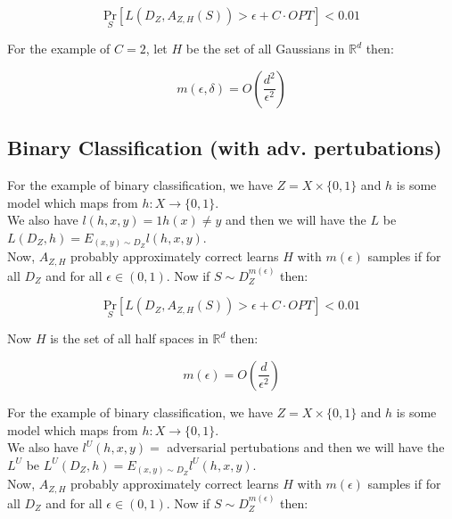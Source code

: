 \documentclass{article}
\begin{document}
\begin{equation}
    \underset{S}{\mathrm{Pr}} [L(D_Z, A_{Z,H}(S)) > \epsilon + C \cdot OPT] < 0.01
\end{equation}

\noindent For the example of $C=2$, let $H$ be the set of all Gaussians in $\mathbb{R}^d$ then:

\begin{equation*}
    m(\epsilon, \delta) = O \left( \frac{d^2}{\epsilon^2} \right)
\end{equation*}

\subsection{Binary Classification (with adv. pertubations)}

\noindent For the example of binary classification, we have $Z = X \times \{ 0, 1 \}$ and $h$ is some model which maps from $h: X \to \{ 0, 1 \}$.\\

\noindent We also have $l(h,x,y) = 1 {h(x) \neq y}$ and then we will have the $L$ be $L(D_Z,h) = E_{(x,y) \sim D_Z} l(h,x,y)$.\\

\noindent Now, $A_{Z,H}$ probably approximately correct learns $H$ with $m(\epsilon)$ samples if for all $D_Z$ and for all $\epsilon \in ( 0,1 )$. Now if $S \sim D_Z^{m(\epsilon)}$ then:

\begin{equation}
    \underset{S}{\mathrm{Pr}} [L(D_Z, A_{Z,H}(S)) > \epsilon + C \cdot OPT] < 0.01
\end{equation}

\noindent Now $H$ is the set of all half spaces in $\mathbb{R}^d$ then:

\begin{equation*}
    m(\epsilon) = O \left( \frac{d}{\epsilon^2} \right)
\end{equation*}

\noindent For the example of binary classification, we have $Z = X \times \{ 0, 1 \}$ and $h$ is some model which maps from $h: X \to \{ 0, 1 \}$.\\

\noindent We also have $l^U(h,x,y) =$ adversarial pertubations and then we will have the $L^U$ be $L^U(D_Z,h) = E_{(x,y) \sim D_Z} l^U(h,x,y)$.\\

\noindent Now, $A_{Z,H}$ probably approximately correct learns $H$ with $m(\epsilon)$ samples if for all $D_Z$ and for all $\epsilon \in ( 0,1 )$. Now if $S \sim D_Z^{m(\epsilon)}$ then:
\end{document}
